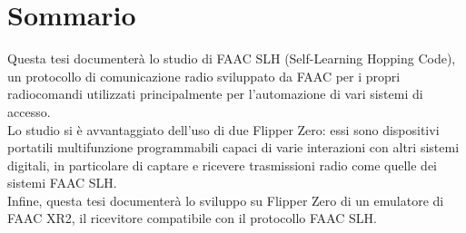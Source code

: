\chapter*{Sommario}
\label{cha:abstract}
\vspace{1 cm}

Questa tesi documenterà lo studio di FAAC SLH (Self-Learning Hopping Code), un protocollo di comunicazione radio sviluppato da FAAC per i propri radiocomandi utilizzati principalmente per l’automazione di vari sistemi di accesso.\\
Lo studio si è avvantaggiato dell’uso di due Flipper Zero: essi sono dispositivi portatili multifunzione programmabili capaci di varie interazioni con altri sistemi digitali, in particolare di captare e ricevere trasmissioni radio come quelle dei sistemi FAAC SLH.\\
Infine, questa tesi documenterà lo sviluppo su Flipper Zero di un emulatore di FAAC XR2, il ricevitore compatibile con il protocollo FAAC SLH.\\
